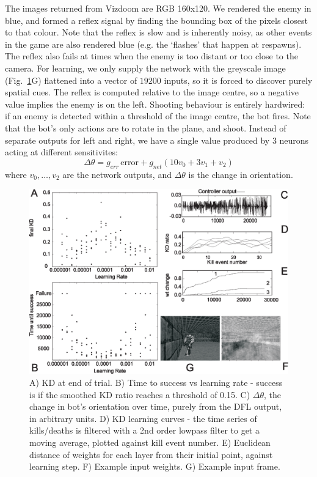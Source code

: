 \documentclass{llncs}
\begin{document}
The images returned from Vizdoom are RGB 160x120. We rendered the
enemy in blue, and formed a reflex signal by finding the bounding box
of the pixels closest to that colour. Note that the reflex is slow and is
inherently noisy, as other events in the game are also rendered blue
(e.g. the ‘flashes’ that happen at respawns). The reflex also fails at
times when the enemy is too distant or too close to the camera. For
learning, we only supply the network with the greyscale image
(Fig.~\ref{shooter_results}G) flattened into a vector of $19200$
inputs, so it is forced to discover purely spatial cues. The reflex is
computed relative to the image centre, so a negative value implies the
enemy is on the left. Shooting behaviour is entirely hardwired: if an
enemy is detected within a threshold of the image centre, the bot
fires. Note that the bot's only actions are to rotate in the plane,
and shoot. Instead of separate outputs for left and right, we have a
single value produced by 3 neurons acting at different sensitivites:
\begin{equation}
\Delta \theta = g_{err}\, \mathrm{error} + g_{net} \left( 10 v_0 + 3 v_1 + v_2 \right)
\end{equation}
where $v_0, \ldots, v_2$ are the network outputs, and $\Delta \theta$ is the change in orientation.


\begin{figure}[h!]
	\centering \includegraphics[width=\columnwidth]{FPSFig7}
	\caption{A) KD at end of trial. B) Time to success vs learning
          rate - success is if the smoothed KD ratio reaches a threshold of 0.15. C) $\Delta \theta$, the change in bot's orientation over time, purely from the DFL output, in arbitrary units. D) KD learning curves - the time series of kills/deaths is filtered with a 2nd order lowpass filter to get a moving average, plotted against kill event number. E)
          Euclidean distance of weights for each layer from their initial point, against learning step. F) Example input weights. G) Example input frame.
		\label{shooter_results}}
\end{figure}
\end{document}
